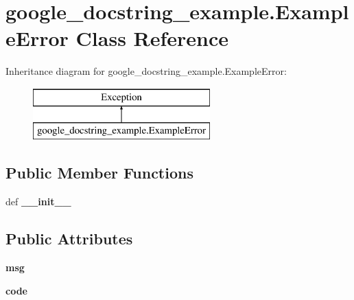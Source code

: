 \hypertarget{classgoogle__docstring__example_1_1ExampleError}{\section{google\+\_\+docstring\+\_\+example.\+Example\+Error Class Reference}
\label{classgoogle__docstring__example_1_1ExampleError}
}
Inheritance diagram for google\+\_\+docstring\+\_\+example.\+Example\+Error\+:\begin{figure}[H]
\begin{center}
\leavevmode
\includegraphics[height=2.000000cm]{classgoogle__docstring__example_1_1ExampleError}
\end{center}
\end{figure}
\subsection*{Public Member Functions}
\begin{DoxyCompactItemize}
\item 
\hypertarget{classgoogle__docstring__example_1_1ExampleError_a7f82075efd3e0aef9e7db900ea7dd961}{def {\bfseries \+\_\+\+\_\+init\+\_\+\+\_\+}}\label{classgoogle__docstring__example_1_1ExampleError_a7f82075efd3e0aef9e7db900ea7dd961}

\end{DoxyCompactItemize}
\subsection*{Public Attributes}
\begin{DoxyCompactItemize}
\item 
\hypertarget{classgoogle__docstring__example_1_1ExampleError_aa84a97ad68bbe5f5e5b96598396a3ae0}{{\bfseries msg}}\label{classgoogle__docstring__example_1_1ExampleError_aa84a97ad68bbe5f5e5b96598396a3ae0}

\item 
\hypertarget{classgoogle__docstring__example_1_1ExampleError_a749126a25024f84564afcba15a8b7b0f}{{\bfseries code}}\label{classgoogle__docstring__example_1_1ExampleError_a749126a25024f84564afcba15a8b7b0f}

\end{DoxyCompactItemize}


